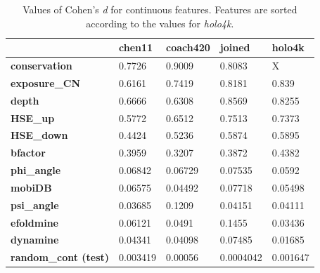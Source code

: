 \begin{table}[]\centering
\begin{tabular}{@{}lllll@{}}
\toprule
                      & \textbf{chen11} & \textbf{coach420} & \textbf{joined} & \textbf{holo4k} \\ \midrule
\textbf{conservation} & 0.7726          & 0.9009            & 0.8083          & X               \\
\textbf{exposure\_CN} & 0.6161          & 0.7419            & 0.8181          & 0.839           \\
\textbf{depth}        & 0.6666          & 0.6308            & 0.8569          & 0.8255          \\
\textbf{HSE\_up}      & 0.5772          & 0.6512            & 0.7513          & 0.7373          \\
\textbf{HSE\_down}    & 0.4424          & 0.5236            & 0.5874          & 0.5895          \\
\textbf{bfactor}      & 0.3959          & 0.3207            & 0.3872          & 0.4382          \\
\textbf{phi\_angle}   & 0.06842         & 0.06729           & 0.07535         & 0.0592          \\
\textbf{mobiDB}       & 0.06575         & 0.04492           & 0.07718         & 0.05498         \\
\textbf{psi\_angle}   & 0.03685         & 0.1209            & 0.04151         & 0.04111         \\
\textbf{efoldmine}    & 0.06121         & 0.0491            & 0.1455          & 0.03436         \\
\textbf{dynamine}     & 0.04341         & 0.04098           & 0.07485         & 0.01685         \\
\textbf{random\_cont (test)} & 0.003419        & 0.00056           & 0.0004042       & 0.001647        \\ \bottomrule
\end{tabular}
\caption{Values of Cohen's \textit{d} for continuous features. Features are sorted according to the values for \textit{holo4k}.}
\label{tab:cohensd}
\end{table}

